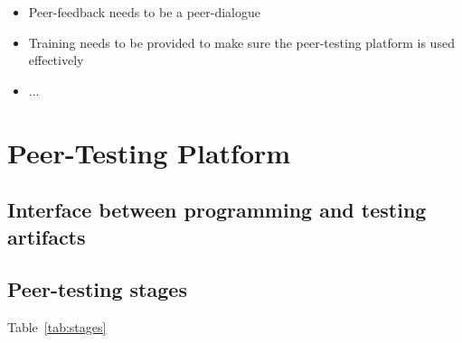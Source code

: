 \documentclass[sigplan,10pt,review]{acmart}\settopmatter{printfolios=true}
\begin{document}
\begin{itemize}
\item Peer-feedback needs to be a peer-dialogue
\item Training needs to be provided to make sure the peer-testing
  platform is used effectively
\item ...
\end{itemize}


\section{Peer-Testing Platform}


\subsection{Interface between programming and testing artifacts}

\subsection{Peer-testing stages}


Table~\ref{tab:stages}
\end{document}

